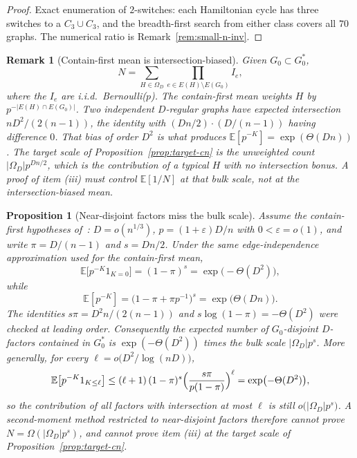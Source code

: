 \documentclass[11pt]{article}
\newtheorem{proposition}[theorem]{Proposition}
\newtheorem{remark}[theorem]{Remark}
\newcommand{\EE}{\mathbb{E}}
\begin{document}
\begin{proof}
Exact enumeration of \(2\)-switches: each Hamiltonian cycle has three switches
to a \(C_3\cup C_3\), and the breadth-first search from either class covers all
\(70\) graphs.
The numerical ratio is Remark~\ref{rem:small-n-inv}.
\end{proof}

\begin{remark}[Contain-first mean is intersection-biased]
\label{rem:mean-skew}
Given \(G_0\subset G^*_0\),
\[
N
=
\sum_{H\in\Omega_D}
\prod_{e\in E(H)\setminus E(G_0)}I_e,
\]
where the \(I_e\) are i.i.d.\ Bernoulli(\(p\)).
The contain-first mean weights \(H\) by \(p^{-|E(H)\cap E(G_0)|}\).
Two independent \(D\)-regular graphs have expected intersection
\(nD^2/(2(n-1))\), the identity with \((Dn/2)\cdot(D/(n-1))\) having
difference \(0\).
That bias of order \(D^2\) is what produces \(\EE[p^{-K}]=\exp(\Theta(Dn))\).
The target scale of Proposition~\ref{prop:target-cn} is the unweighted
count \(\lvert\Omega_D\rvert p^{Dn/2}\), which is the contribution of a
typical \(H\) with no intersection bonus.
A proof of item (iii) must control \(\EE[1/N]\) at that bulk scale, not at
the intersection-biased mean.
\end{remark}

\begin{proposition}[Near-disjoint factors miss the bulk scale]
\label{prop:near-disjoint-miss}
Assume the contain-first hypotheses of~\cite{PlusOneV1}: \(D=o(n^{1/3})\),
\(p=(1+\varepsilon)D/n\) with \(0<\varepsilon=o(1)\), and write
\(\pi=D/(n-1)\) and \(s=Dn/2\).
Under the same edge-independence approximation used for the contain-first mean,
\[
\EE\bigl[p^{-K}1_{K=0}\bigr]
=
(1-\pi)^{s}
=
\exp\bigl(-\Theta(D^2)\bigr),
\]
while
\[
\EE[p^{-K}]
=
\bigl(1-\pi+\pi p^{-1}\bigr)^{s}
=
\exp\bigl(\Theta(Dn)\bigr).
\]
The identities
\(s\pi=D^2 n/(2(n-1))\) and
\(s\log(1-\pi)=-\Theta(D^2)\)
were checked at leading order.
Consequently the expected number of \(G_0\)-disjoint \(D\)-factors contained in
\(G^*_0\) is \(\exp(-\Theta(D^2))\) times the bulk scale
\(\lvert\Omega_D\rvert p^{s}\).
More generally, for every \(\ell=o\bigl(D^2/\log(nD)\bigr)\),
\[
\EE\bigl[p^{-K}1_{K\le\ell}\bigr]
\le
(\ell+1)\,(1-\pi)^{s}\Bigl(\frac{s\pi}{p(1-\pi)}\Bigr)^{\ell}
=
\exp\bigl(-\Theta(D^2)\bigr),
\]
so the contribution of all factors with intersection at most \(\ell\) is still
\(o\bigl(\lvert\Omega_D\rvert p^{s}\bigr)\).
A second-moment method restricted to near-disjoint factors therefore cannot
prove \(N=\Omega(\lvert\Omega_D\rvert p^{s})\), and cannot prove item (iii) at the
target scale of Proposition~\ref{prop:target-cn}.
\end{proposition}
\end{document}
